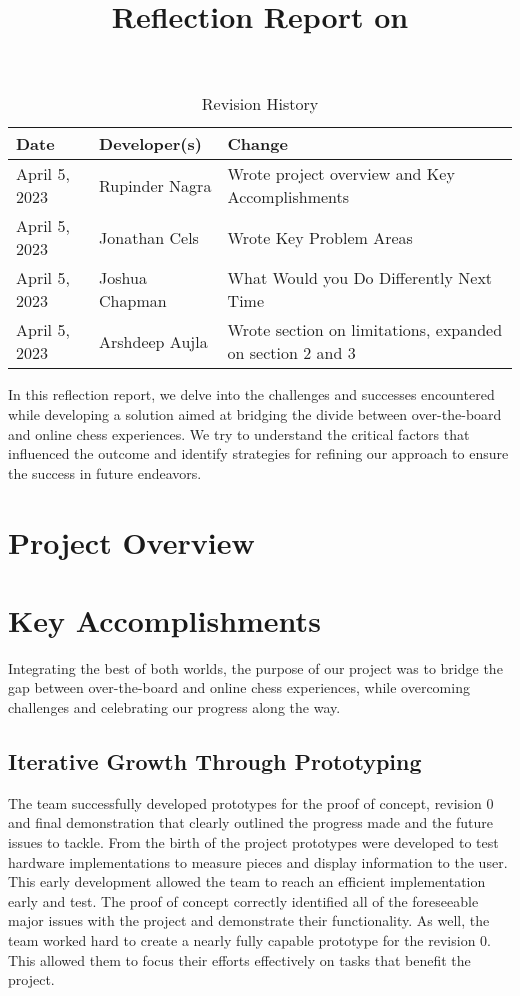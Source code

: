 \documentclass{article}
\title{Reflection Report on \progname}
\author{\authname}
\date{}
\begin{document}
\begin{table}[hp]
\caption{Revision History} \label{TblRevisionHistory}
\begin{tabularx}{\textwidth}{llX}
\toprule
\textbf{Date} & \textbf{Developer(s)} & \textbf{Change}\\
\midrule
April 5, 2023 & Rupinder Nagra & Wrote project overview and Key Accomplishments\\
April 5, 2023 & Jonathan Cels & Wrote Key Problem Areas\\
April 5, 2023 & Joshua Chapman & What Would you Do Differently Next Time\\
April 5, 2023 & Arshdeep Aujla & Wrote section on limitations, expanded on section 2 and 3\\
\bottomrule
\end{tabularx}
\end{table}

\newpage

\maketitle

In this reflection report, we delve into the challenges and successes encountered while developing a solution aimed at bridging the divide between over-the-board and online chess experiences. We try to understand the critical factors that influenced the outcome and identify strategies for refining our approach to ensure the success in future endeavors.

\section{Project Overview}
\projectoverview

\section{Key Accomplishments}

Integrating the best of both worlds, the purpose of our project was to bridge the gap between over-the-board and online chess experiences, while overcoming challenges and celebrating our progress along the way.

\subsection{Iterative Growth Through Prototyping}
The team successfully developed prototypes for the proof of concept, revision 0 and final 
demonstration that clearly outlined the progress made and the future issues to tackle. From 
the birth of the project prototypes were developed to test hardware implementations to measure
pieces and display information to the user. This early development allowed the team to reach 
an efficient implementation early and test. The proof of concept correctly identified all of 
the foreseeable major issues with the project and demonstrate their functionality. As well, 
the team worked hard to create a nearly fully capable prototype for the revision 0. This allowed
them to focus their efforts effectively on tasks that benefit the project. 
\end{document}
